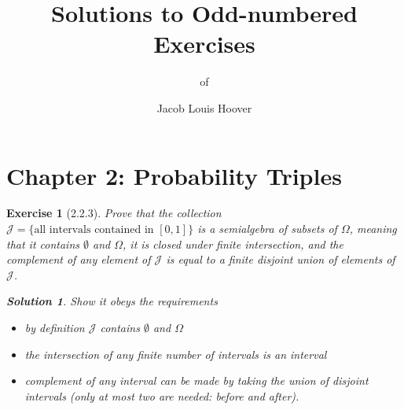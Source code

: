 \documentclass[]{scrartcl}
\theoremstyle{break}
\newtheorem*{exercise}{Exercise}
\theoremstyle{definition}
\theoremstyle{break}\theorembodyfont{\normalfont}\theoremheaderfont{\itshape}
\newtheorem*{solution}{Solution}
\begin{document}
\title{Solutions to Odd-numbered Exercises}
\subtitle{of  \citep{rosenthal.j:2006}}
\author{Jacob Louis Hoover}
\date{}

\maketitle

\section*{Chapter 2: Probability Triples}

\begin{exercise}[2.2.3]
  Prove that the collection
  \(\mathcal{J}=\{\text{all intervals contained in }[0,1]\}\)
  is a \emph{semialgebra} of subsets of $\Omega$, meaning that it contains
  $\emptyset$ and $\Omega$, it is closed under finite intersection, and the
  complement of any element of $\mathcal{J}$ is equal to a finite disjoint
  union of elements of $\mathcal{J}$.
  \begin{solution}
  Show it obeys the requirements
    \begin{itemize}[noitemsep]
      \item by definition $\mathcal{J}$ contains $\emptyset$ and $\Omega$
      \item the intersection of any finite number of intervals is an interval
      \item complement of any interval can be made by taking the union of disjoint
        intervals (only at most two are needed: before and after).
    \end{itemize}
  \end{solution}
\end{exercise}
\end{document}
